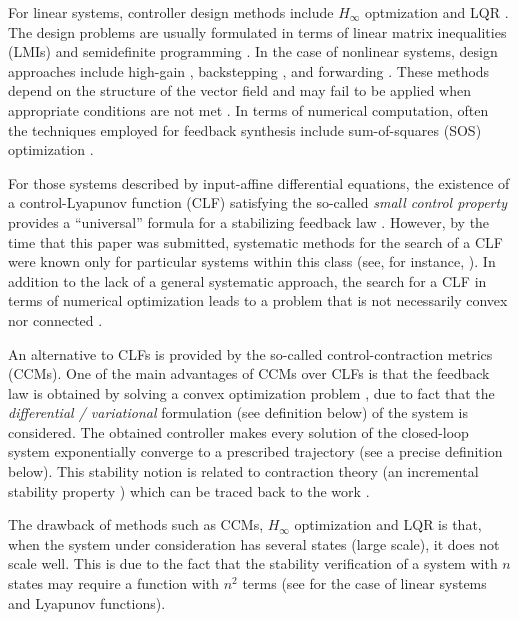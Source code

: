 \documentclass[10pt,twocolumn,twoside]{IEEEtran}
\theoremstyle{plain}
\theoremstyle{definition}
\theoremstyle{remark}
\begin{document}
For linear systems, controller design methods include $H_\infty$ optmization \cite{Doyleetal1992} and LQR \cite{Hespanha:2009}. The design problems are usually formulated in terms of linear matrix inequalities (LMIs) and semidefinite programming \cite{Boyd1994,DullerudPaganini2000}. In the case of nonlinear systems, design approaches include high-gain  \cite{GrognardSepulchreBastin1999}, backstepping \cite{Krstic1995}, and forwarding \cite{MazencPraly96}. These methods depend on the structure of the vector field and may fail to be applied when appropriate conditions are not met \cite{SteinShiromoto2013a}. In terms of numerical computation, often the techniques employed for feedback synthesis include sum-of-squares (SOS) optimization \cite{Parrilo2003}.

For those systems described by input-affine differential equations,  the existence of a control-Lyapunov function (CLF) satisfying the so-called \emph{small control property} provides a ``universal'' formula for a stabilizing feedback law  \cite{Sontag1983,Sontag1989a}. However, by the time that this paper was submitted, systematic methods for the search of a CLF were known only for particular systems within this class (see, for instance, \cite{MazencMalisoff2006}). In addition to the lack of a general systematic approach, the search for a CLF in terms of numerical optimization leads to a problem that is not necessarily convex nor connected \cite{Rantzer:2001}.

An alternative to CLFs is provided by the so-called control-contraction metrics (CCMs). One of the main advantages of CCMs over CLFs is that the feedback law is obtained by solving a convex optimization problem \cite{Manchester2014a}, due to fact that the \emph{differential / variational} formulation (see definition below) of the system is considered. The obtained controller makes every solution of the closed-loop system exponentially converge to a prescribed trajectory (see a precise definition below). This stability notion is related to contraction theory (an incremental stability property \cite{Angeli2002,Lohmiller1998,Rueffer2013,Sontag2010,Forni2014}) which can be traced back to the work \cite{Lewis1949}.

The drawback of methods such as CCMs, $H_\infty$ optimization and LQR is that, when the system under consideration has several states (large scale), it does not scale well. This is due to the fact that the stability verification of a system with $n$ states may require a function with $n^2$ terms (see \cite{Rantzer2015} for the case of linear systems and Lyapunov functions).
\end{document}
